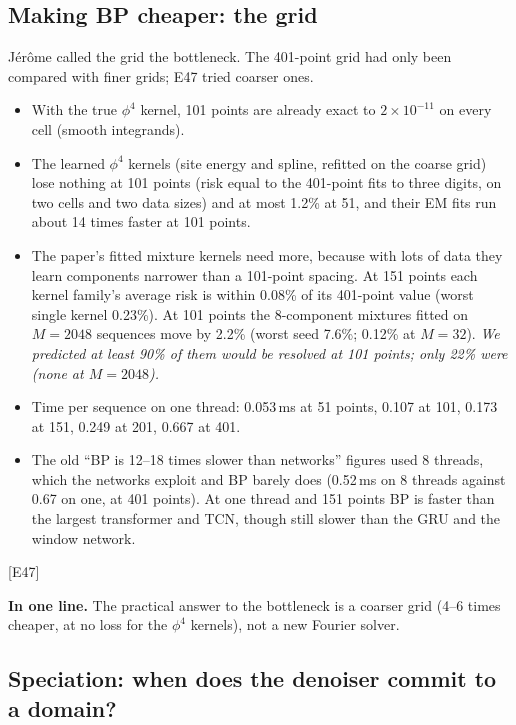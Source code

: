 \documentclass[11pt,a4paper]{article}
\newcommand{\key}[1]{\par\smallskip\noindent\colorbox{soft}{\parbox{\dimexpr\linewidth-2\fboxsep}{\small\textbf{In one line.} #1}}\par\smallskip}
\newcommand{\src}[1]{{\footnotesize\color{gray}[#1]}}
\newcommand{\fals}[1]{{\small\itshape #1}}
\begin{document}
\subsection{Making BP cheaper: the grid}

Jérôme called the grid the bottleneck. The 401-point grid had only been compared with finer grids; E47 tried coarser ones.
\begin{itemize}
\item With the true $\phi^4$ kernel, 101 points are already exact to $2\times10^{-11}$ on every cell (smooth integrands).
\item The learned $\phi^4$ kernels (site energy and spline, refitted on the coarse grid) lose nothing at 101 points (risk equal to the
401-point fits to three digits, on two cells and two data sizes) and at most 1.2\% at 51, and their EM fits run about 14 times faster
at 101 points.
\item The paper's fitted mixture kernels need more, because with lots of data they learn components narrower than a 101-point spacing. At 151 points each kernel family's average risk is within 0.08\% of its
401-point value (worst single kernel 0.23\%). At 101 points the 8-component mixtures fitted on $M=2048$ sequences move by 2.2\% (worst
seed 7.6\%; 0.12\% at $M=32$). \fals{We predicted at least 90\% of them
would be resolved at 101 points; only 22\% were (none at $M=2048$).}
\item Time per sequence on one thread: 0.053\,ms at 51 points, 0.107 at 101, 0.173 at 151, 0.249 at 201, 0.667 at 401.
\item The old ``BP is 12--18 times slower than networks'' figures used 8 threads, which the networks exploit and BP barely does (0.52\,ms
on 8 threads against 0.67 on one, at 401 points). At one thread and 151 points BP is faster than the largest transformer and TCN,
though still slower than the GRU and the window network.
\end{itemize}
\src{E47}

\key{The practical answer to the bottleneck is a coarser grid (4--6 times cheaper, at no loss for the $\phi^4$ kernels), not a new Fourier solver.}

\subsection{Speciation: when does the denoiser commit to a domain?}
\end{document}
